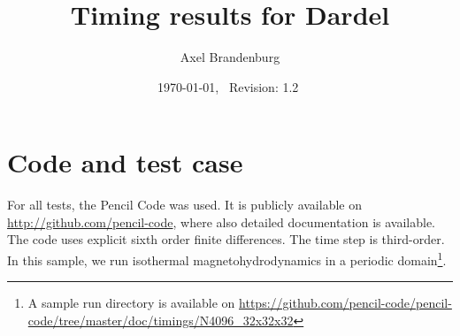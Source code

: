 \documentclass[twocolumn]{article}
\title{Timing results for Dardel}
\author{Axel Brandenburg}
\date{\today,~ $ $Revision: 1.2 $ $}
\begin{document}
\maketitle

\section{Code and test case}

For all tests, the {\sc Pencil Code} was used.
It is publicly available on \url{http://github.com/pencil-code},
where also detailed documentation is available.
The code uses explicit sixth order finite differences.
The time step is third-order.
In this sample, we run isothermal magnetohydrodynamics
in a periodic domain\footnote{A sample run directory is available on
\url{https://github.com/pencil-code/pencil-code/tree/master/doc/timings/N4096_32x32x32}}.
\end{document}
